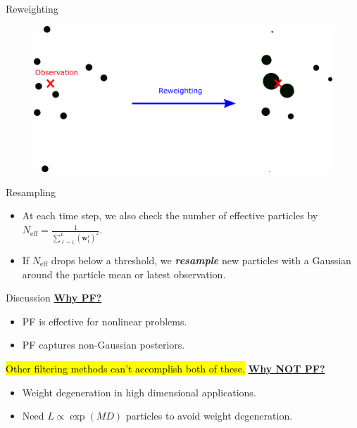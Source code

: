 \documentclass[aspectratio=169]{beamer}
\makeatletter
\let\HL\hl
\renewcommand\hl{%
  \let\set@color\beamerorig@set@color
  \let\reset@color\beamerorig@reset@color
  \HL}
\newcommand\boldgreen[1]{\textcolor{lighter_csu_green}{\emph{\textbf{#1}}}}
\newcommand{\weights}{\boldsymbol{w}}
\makeatother
\begin{document}

\begin{frame}{Reweighting}
\vfill
\begin{figure}[H]
    \centering
    \includegraphics[width=.85\textwidth]{figures/reweighting.png}
\end{figure}
\vspace*{.25cm}
\end{frame}


\begin{frame}{Resampling}
\vfill
\begin{itemize}
    \item At each time step, we also check the number of effective particles by $N_{\textrm{eff}} = \frac{1}{\sum_{\ell =1}^L (\weights_t^\ell)^2}$.
    \item If $N_{\textrm{eff}}$ drops below a threshold, we \boldgreen{resample} new particles with a Gaussian around the particle mean or latest observation.
\end{itemize}
\vfill
\end{frame}



\begin{frame}{Discussion}
\vfill
    \textbf{\underline{Why PF?}} 
    \begin{itemize}
        \item PF is effective for nonlinear problems.
        \item PF captures non-Gaussian posteriors.
    \end{itemize}

\hl{Other filtering methods can't accomplish both of these.}
\vspace*{.25cm}
    \textbf{\underline{Why NOT PF?}}
    \begin{itemize}
        \item Weight degeneration in high dimensional applications.
        \item Need $L\propto \exp(MD)$ particles to avoid weight degeneration.
    \end{itemize}
\vfill
\end{frame}
\end{document}

